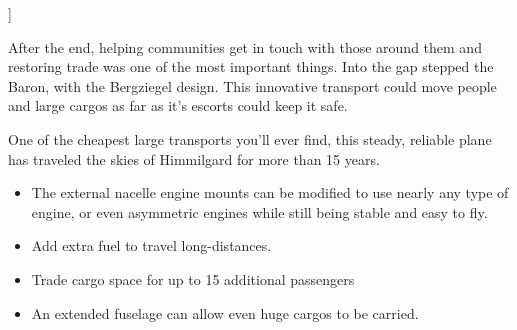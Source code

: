 \documentclass[twoside,headings,a4paper]{article}
\begin{document}
]{
    After the end, helping communities get in touch with those around them and restoring trade was one of the most important things.  Into the gap stepped the Baron, with the Bergziegel design.  This innovative transport could move people and large cargos as far as it's escorts could keep it safe.

    One of the cheapest large transports you'll ever find, this steady, reliable plane has traveled the skies of Himmilgard for more than 15 years.

    \columnbreak

    \begin{itemize}
        \item The external nacelle engine mounts can be modified to use nearly any type of engine, or even asymmetric engines while still being stable and easy to fly.
        \item Add extra fuel to travel long-distances.
        \item Trade cargo space for up to 15 additional passengers
        \item An extended fuselage can allow even huge cargos to be carried.
    \end{itemize}
}
\end{document}
